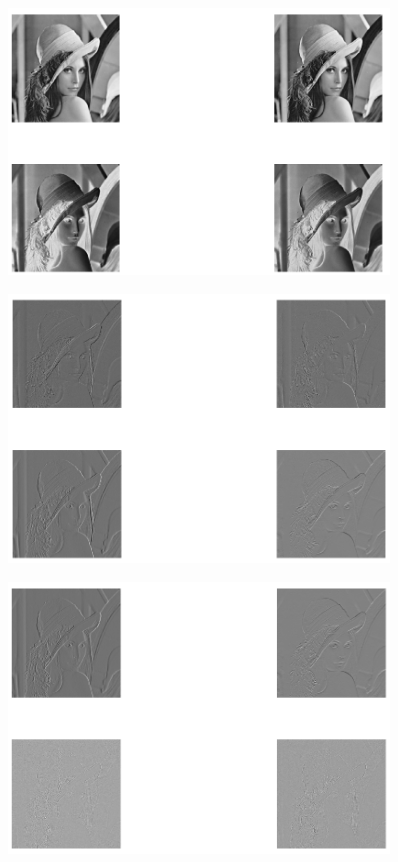 \documentclass{article}
\begin{document}
 \begin{figure}[H]
    \includegraphics[width=0.9\textwidth]{figura1.png}
\end{figure}
 \begin{figure}[H]
    \includegraphics[width=0.9\textwidth]{figura2.png}
\end{figure}
 \begin{figure}[H]
    \includegraphics[width=0.9\textwidth]{figura3.png}
\end{figure}
\end{document}
